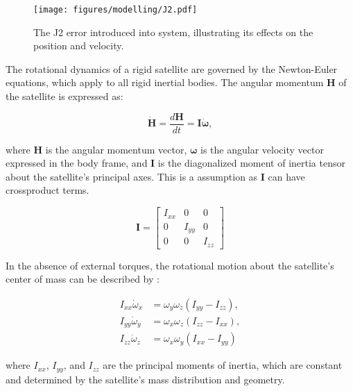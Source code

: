 \begin{figure}[H]
    \centering
    \texttt{[image: figures/modelling/J2.pdf]}
    \caption{The J2 error introduced into system, illustrating its effects on the position and velocity.}
    \label{fig:3.4}
\end{figure}


The rotational dynamics of a rigid satellite are governed by the Newton-Euler equations, which apply to all rigid inertial bodies.
 The angular momentum $\mathbf{H}$ of the satellite is expressed as:

\begin{equation}
\dot{\mathbf{H}} = \frac{d\mathbf{H}}{dt} = \mathbf{I}\dot{\boldsymbol{\omega}},
\end{equation}

\noindent where $\mathbf{H}$ is the angular momentum vector, $\boldsymbol{\omega}$ is the angular velocity vector expressed in the body 
frame, and $\mathbf{I}$ is the diagonalized moment of inertia tensor about the satellite's principal axes. This is a assumption as $\mathbf{I}$ can have crossproduct terms.

\begin{equation}
    \mathbf{I} = 
    \begin{bmatrix}
        I_{xx} & 0 & 0 \\
        0 & I_{yy} & 0 \\
        0 & 0 & I_{zz}
    \end{bmatrix}
\end{equation}

\noindent In the absence of external torques, the rotational motion about the satellite's center of mass can be described by \cite{Trivailo}:

\begin{align}
I_{xx} \dot{\omega}_x &= \omega_y \omega_z (I_{yy} - I_{zz}), \\
I_{yy} \dot{\omega}_y &= \omega_x \omega_z (I_{zz} - I_{xx}), \\
I_{zz} \dot{\omega}_z &= \omega_x \omega_y (I_{xx} - I_{yy})
\end{align}

\noindent where $I_{xx}$, $I_{yy}$, and $I_{zz}$ are the principal moments of inertia, which are constant and determined by the satellite's mass distribution and geometry.
\vspace{0.5cm}

